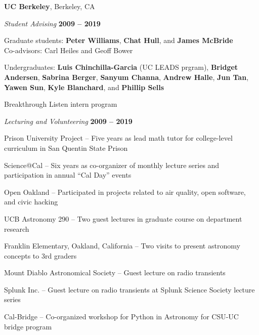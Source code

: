 \documentclass[11pt]{article}
\begin{document}
\textbf{UC Berkeley}, Berkeley, CA
\begin{outerlist}
\item[] \textit{Student Advising}
    \hfill \textbf{2009 -- 2019}
    \begin{innerlist}
      \item Graduate students: \textbf{Peter Williams}, \textbf{Chat Hull}, and \textbf{James McBride} \\
        Co-advisors: Carl Heiles and Geoff Bower %
      \item Undergraduates: \textbf{Luis Chinchilla-Garcia} (UC LEADS prgram), \textbf{Bridget Andersen}, \textbf{Sabrina Berger}, \textbf{Sanyum Channa}, \textbf{Andrew Halle}, \textbf{Jun Tan}, \textbf{Yawen Sun}, \textbf{Kyle Blanchard}, and \textbf{Phillip Sells}  %
      \item Breakthrough Listen intern program
     \end{innerlist}

\item[] \textit{Lecturing and Volunteering}
    \hfill \textbf{2009 -- 2019}
    \begin{innerlist}
        \item Prison University Project -- Five years as lead math tutor for college-level curriculum in San Quentin State Prison
        \item Science@Cal -- Six years as co-organizer of monthly lecture series and participation in annual ``Cal Day'' events
        \item Open Oakland -- Participated in projects related to air quality, open software, and civic hacking
        \item UCB Astronomy 290 -- Two guest lectures in graduate course on department research
        \item Franklin Elementary, Oakland, California -- Two visits to present astronomy concepts to 3rd graders
        \item Mount Diablo Astronomical Society -- Guest lecture on radio transients
        \item Splunk Inc. -- Guest lecture on radio transients at Splunk Science Society lecture series
        \item Cal-Bridge -- Co-organized workshop for Python in Astronomy for CSU-UC bridge program
    \end{innerlist}

\end{outerlist}
\end{document}
